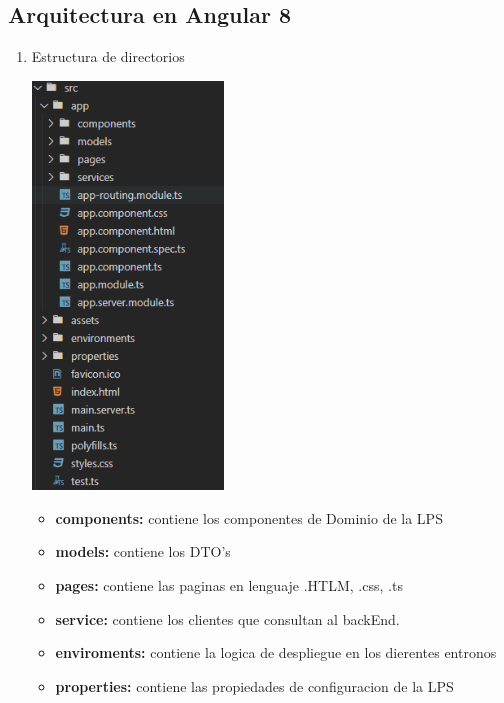 \documentclass[10pt,a4paper,openany]{book}
\begin{document}
\subsection{Arquitectura en Angular 8}
\begin{enumerate}

\item Estructura de directorios\\
\begin{center}
\includegraphics[width=0.4\textwidth]{est2}
\end{center}
\begin{itemize}
	\item \textbf{components:} contiene los componentes de Dominio de la LPS
	\item \textbf{models:} contiene los DTO's 
	\item \textbf{pages:} contiene las paginas en lenguaje .HTLM, .css, .ts  
	\item \textbf{service:} contiene los clientes que consultan al backEnd.
	\item \textbf{enviroments:} contiene la logica de despliegue en los dierentes entronos
	\item \textbf{properties:} contiene las propiedades de configuracion de la LPS
\end{itemize}
\end{enumerate}

\end{document}
